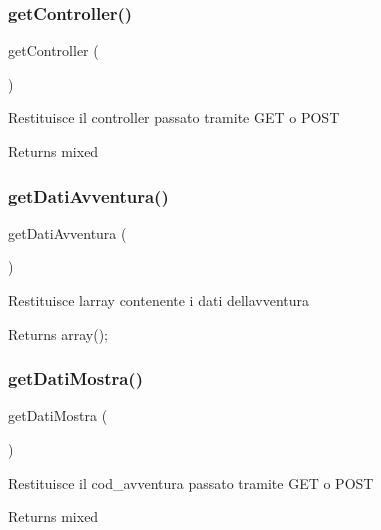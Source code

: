 \subsubsection{\texorpdfstring{get\+Controller()}{getController()}}
{\footnotesize\ttfamily get\+Controller (\begin{DoxyParamCaption}{ }\end{DoxyParamCaption})}

Restituisce il controller passato tramite G\+ET o P\+O\+ST

\begin{DoxyReturn}{Returns}
mixed 
\end{DoxyReturn}
\mbox{\label{class_v_upload_aff474932615e2b87b025f2ab9ba68598}} 
\subsubsection{\texorpdfstring{get\+Dati\+Avventura()}{getDatiAvventura()}}
{\footnotesize\ttfamily get\+Dati\+Avventura (\begin{DoxyParamCaption}{ }\end{DoxyParamCaption})}

Restituisce l\textquotesingle{}array contenente i dati dell\textquotesingle{}avventura

\begin{DoxyReturn}{Returns}
array(); 
\end{DoxyReturn}
\mbox{\label{class_v_upload_a21c1b6e37828f68cadec73d5fe012eef}} 
\subsubsection{\texorpdfstring{get\+Dati\+Mostra()}{getDatiMostra()}}
{\footnotesize\ttfamily get\+Dati\+Mostra (\begin{DoxyParamCaption}{ }\end{DoxyParamCaption})}

Restituisce il cod\+\_\+avventura passato tramite G\+ET o P\+O\+ST

\begin{DoxyReturn}{Returns}
mixed 
\end{DoxyReturn}
\mbox{\label{class_v_upload_a13871c4434338f02d6f8d430fa0597f2}} 
